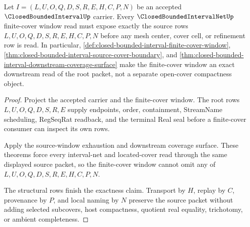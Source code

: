 \begin{theorem}
\label{thm:closed-bounded-interval-finite-cover-window-exactness}
Let $I=(L,U,O,Q,D,S,R,E,H,C,P,N)$ be an accepted $\ClosedBoundedIntervalUp$ carrier. Every $\ClosedBoundedIntervalNetUp$ finite-cover window read must expose exactly the source rows $L,U,O,Q,D,S,R,E,H,C,P,N$ before any mesh center, cover cell, or refinement row is read. In particular, \autoref{def:closed-bounded-interval-finite-cover-window}, \autoref{thm:closed-bounded-interval-source-cover-boundary}, and \autoref{thm:closed-bounded-interval-downstream-coverage-surface} make the finite-cover window an exact downstream read of the root packet, not a separate open-cover compactness object.
\end{theorem}
\begin{proof}
Project the accepted carrier and the finite-cover window. The root rows $L,U,O,Q,D,S,R,E$ supply endpoints, order, containment, StreamName scheduling, RegSeqRat readback, and the terminal Real seal before a finite-cover consumer can inspect its own rows.

Apply the source-window exhaustion and downstream coverage surface. These theorems force every interval-net and located-cover read through the same displayed source packet, so the finite-cover window cannot omit any of $L,U,O,Q,D,S,R,E,H,C,P,N$.

The structural rows finish the exactness claim. Transport by $H$, replay by $C$, provenance by $P$, and local naming by $N$ preserve the source packet without adding selected subcovers, host compactness, quotient real equality, trichotomy, or ambient completeness.
\end{proof}


